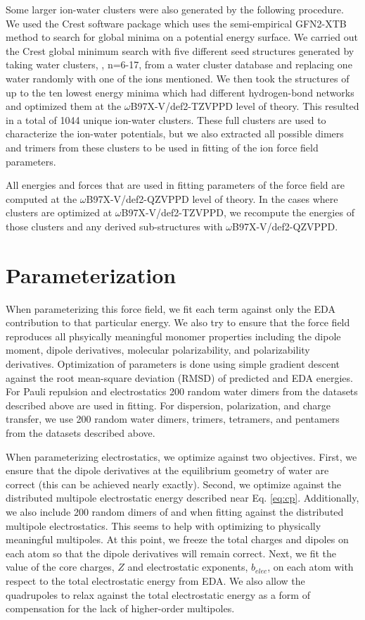 \documentclass[journal=jacsat,manuscript=article]{achemso}
\begin{document}
Some larger ion-water clusters were also generated by the following procedure.
We used the Crest software package\cite{pracht2020automated} which uses the semi-empirical GFN2-XTB\cite{bannwarth2019gfn2}
method to search for global minima on a potential energy surface. We carried out the Crest global minimum
search with five different seed structures generated by taking water clusters, , n=6-17, from a
water cluster database\cite{rakshit2019atlas} and replacing one water randomly with one of the ions mentioned.
We then took the structures of up to the ten lowest energy minima which had different hydrogen-bond
networks and optimized them at the $\omega$B97X-V/def2-TZVPPD level of theory. This resulted in a total
of 1044 unique ion-water clusters. These full clusters
are used to characterize the ion-water potentials, but we also extracted all possible dimers
and trimers from these clusters to be used in fitting of the ion force field parameters.

All energies and forces that are used in fitting parameters of the force field are computed
at the $\omega$B97X-V/def2-QZVPPD level of theory. In the cases where clusters are optimized at
$\omega$B97X-V/def2-TZVPPD, we recompute the energies of those clusters and any derived sub-structures
with $\omega$B97X-V/def2-QZVPPD.

\section*{Parameterization}

When parameterizing this force field, we fit each term against only the EDA contribution
to that particular energy. We also try to ensure that the force field reproduces
all phsyically meaningful monomer properties including the dipole moment, dipole derivatives,
molecular polarizability, and polarizability derivatives. Optimization of parameters is done using simple gradient descent
against the root mean-square deviation (RMSD) of predicted and EDA energies.
For Pauli repulsion and electrostatics 200 random water dimers from the datasets
described above are used in fitting. For dispersion, polarization, and charge transfer, we use
200 random water dimers, trimers, tetramers, and pentamers from the datasets described above.

When parameterizing electrostatics, we optimize against two objectives. First, we ensure
that the dipole derivatives at the equilibrium geometry of water are correct (this can be achieved
nearly exactly). Second, we optimize against the distributed multipole electrostatic energy described
near Eq. \ref{eq:cp}. Additionally, we also include 200 random dimers
of  and  when fitting against the distributed multipole electrostatics.
This seems to help with optimizing to physically meaningful multipoles.
At this point, we freeze the total charges and dipoles on each atom so that the dipole derivatives
will remain correct. Next, we fit the value of the core charges, $Z$ and electrostatic exponents, $b_{elec}$, on each atom
with respect to the total electrostatic energy from EDA. We also allow the quadrupoles to relax
against the total electrostatic energy as a form of compensation for the lack of higher-order multipoles.
\end{document}
